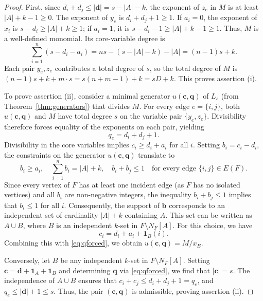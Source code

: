 \documentclass[12pt]{amsart}
\theoremstyle{definition}
\theoremstyle{remark}
\begin{document}
\begin{proof}
First, since $d_i + d_j \le |\mathbf{d}| = s - |A| - k$, the exponent of $z_e$ in $M$ is at least $|A| + k - 1 \ge 0$. The exponent of $y_e$ is $d_i + d_j + 1 \ge 1$. If $a_i = 0$, the exponent of $x_i$ is $s - d_i \ge |A| + k \ge 1$; if $a_i = 1$, it is $s - d_i - 1 \ge |A| + k - 1 \ge 1$. Thus, $M$ is a well-defined monomial. Its core-variable degree is
\[
\sum_{i=1}^n (s - d_i - a_i) = ns - (s - |A| - k) - |A| = (n - 1)s + k.
\]
Each pair $y_e, z_e$ contributes a total degree of $s$, so the total degree of $M$ is $(n - 1)s + k + m \cdot s = s(n + m - 1) + k = sD + k$. This proves assertion (i).

To prove assertion (ii), consider a minimal generator $u(\mathbf{c}, \mathbf{q})$ of $L_s$ (from Theorem~\ref{thm:generators}) that divides $M$. For every edge $e = \{i, j\}$, both $u(\mathbf{c}, \mathbf{q})$ and $M$ have total degree $s$ on the variable pair $\{y_e, z_e\}$. Divisibility therefore forces equality of the exponents on each pair, yielding
\begin{equation}\label{eq:qforced}
q_e = d_i + d_j + 1.
\end{equation}
Divisibility in the core variables implies $c_i \ge d_i + a_i$ for all $i$. Setting $b_i = c_i - d_i$, the constraints on the generator $u(\mathbf{c}, \mathbf{q})$ translate to
\begin{equation}\label{eq:bconditions}
b_i \ge a_i, \quad \sum_{i=1}^n b_i = |A| + k, \quad b_i + b_j \le 1 \quad \text{for every edge } \{i, j\} \in E(F).
\end{equation}
Since every vertex of $F$ has at least one incident edge (as $F$ has no isolated vertices) and all $b_i$ are non-negative integers, the inequality $b_i + b_j \le 1$ implies that $b_i \le 1$ for all $i$. Consequently, the support of $\mathbf{b}$ corresponds to an independent set of cardinality $|A| + k$ containing $A$. This set can be written as $A \cup B$, where $B$ is an independent $k$-set in $F \setminus N_F[A]$. For this choice, we have
\[
c_i = d_i + a_i + \mathbf{1}_B(i).
\]
Combining this with \eqref{eq:qforced}, we obtain $u(\mathbf{c}, \mathbf{q}) = M / x_B$.

Conversely, let $B$ be any independent $k$-set in $F \setminus N_F[A]$. Setting $\mathbf{c} = \mathbf{d} + \mathbf{1}_A + \mathbf{1}_B$ and determining $\mathbf{q}$ via \eqref{eq:qforced}, we find that $|\mathbf{c}| = s$. The independence of $A \cup B$ ensures that $c_i + c_j \le d_i + d_j + 1 = q_e$, and $q_e \le |\mathbf{d}| + 1 \le s$. Thus, the pair $(\mathbf{c}, \mathbf{q})$ is admissible, proving assertion (ii).


\end{proof}
\end{document}
